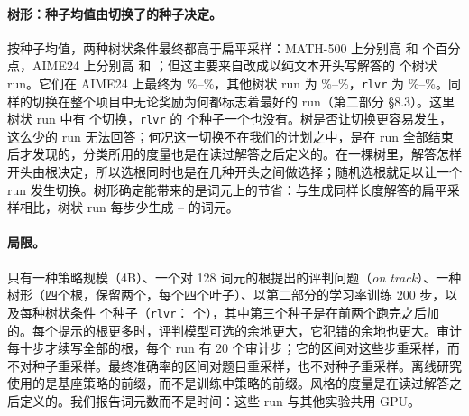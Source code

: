\paragraph{树形：种子均值由切换了的种子决定。} 按种子均值，两种树状条件最终都高于扁平采样：MATH-500 上分别高  和  个百分点，AIME24 上分别高  和 ；但这主要来自改成以纯文本开头写解答的  个树状 run。它们在 AIME24 上最终为 \%--\%，其他树状 run 为 \%--\%，\texttt{rlvr} 为 \%--\%。同样的切换在整个项目中无论奖励为何都标志着最好的 run（第二部分 \S8.3）。这里树状 run 中有  个切换，\texttt{rlvr} 的  个种子一个也没有。树是否让切换更容易发生，这么少的 run 无法回答；何况这一切换不在我们的计划之中，是在 run 全部结束后才发现的，分类所用的度量也是在读过解答之后定义的。在一棵树里，解答怎样开头由根决定，所以选根同时也是在几种开头之间做选择；随机选根就足以让一个 run 发生切换。树形确定能带来的是词元上的节省：与生成同样长度解答的扁平采样相比，树状 run 每步少生成 -- 的词元。

\paragraph{局限。} 只有一种策略规模（4B）、一个对 128 词元的根提出的评判问题（\emph{on track}）、一种树形（四个根，保留两个，每个四个叶子）、以第二部分的学习率训练 200 步，以及每种树状条件  个种子（\texttt{rlvr}： 个），其中第三个种子是在前两个跑完之后加的。每个提示的根更多时，评判模型可选的余地更大，它犯错的余地也更大。审计每十步才续写全部的根，每个 run 有 20 个审计步；它的区间对这些步重采样，而不对种子重采样。最终准确率的区间对题目重采样，也不对种子重采样。离线研究使用的是基座策略的前缀，而不是训练中策略的前缀。风格的度量是在读过解答之后定义的。我们报告词元数而不是时间：这些 run 与其他实验共用 GPU。
